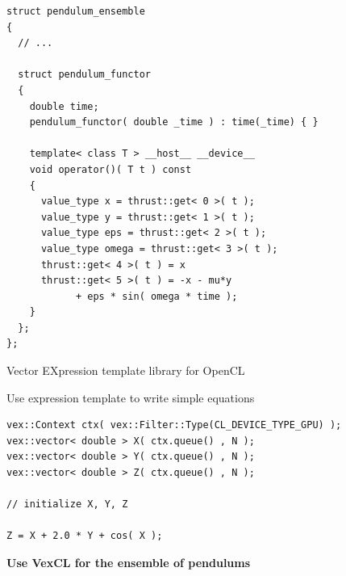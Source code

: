 \begin{frame}[fragile]


 \begin{lstlisting}[basicstyle=\scriptsize\ttfamily]
struct pendulum_ensemble
{
  // ...

  struct pendulum_functor
  {
    double time;
    pendulum_functor( double _time ) : time(_time) { }
    
    template< class T > __host__ __device__
    void operator()( T t ) const
    {
      value_type x = thrust::get< 0 >( t );
      value_type y = thrust::get< 1 >( t );
      value_type eps = thrust::get< 2 >( t );
      value_type omega = thrust::get< 3 >( t );
      thrust::get< 4 >( t ) = x
      thrust::get< 5 >( t ) = -x - mu*y
            + eps * sin( omega * time );
    }
  };
};
 \end{lstlisting}


\end{frame}



\begin{frame}[fragile]

\centerline{\scriptsize Vector EXpression template library for OpenCL}

\vspace{2ex}

Use expression template to write simple equations

\begin{lstlisting}
vex::Context ctx( vex::Filter::Type(CL_DEVICE_TYPE_GPU) );
vex::vector< double > X( ctx.queue() , N );
vex::vector< double > Y( ctx.queue() , N );
vex::vector< double > Z( ctx.queue() , N );

// initialize X, Y, Z

Z = X + 2.0 * Y + cos( X );
\end{lstlisting}

\vspace{2ex}
\centerline{\bf Use VexCL for the ensemble of pendulums}

\end{frame}



